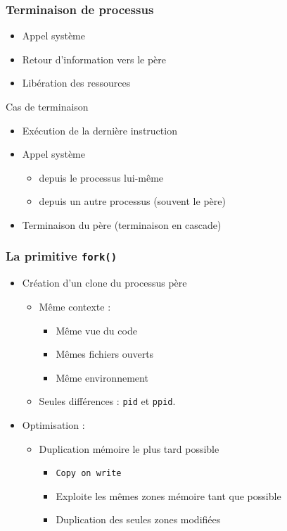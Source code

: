 \begin{frame}
\frametitle{Terminaison de processus}
\begin{itemize}
\item Appel système
\item Retour d’information vers le père
\item Libération des ressources
\end{itemize}
\begin{block}{Cas de terminaison}
\begin{itemize}
\item Exécution de la dernière instruction
\item Appel système 
\begin{itemize}
\item depuis le processus lui-même
\item depuis un autre processus (souvent le père)
\end{itemize}
\item Terminaison du père (terminaison en cascade)
\end{itemize}
\end{block}
\end{frame}


\begin{frame}
\frametitle{La primitive \texttt{fork()}}
\begin{itemize}
\item <1> Création d’un clone du processus père
\begin{itemize}
\item Même contexte :
\begin{itemize}
\item Même vue du code
\item Mêmes fichiers ouverts
\item Même environnement
\end{itemize}
\item Seules différences : \texttt{pid} et \texttt{ppid}.
\end{itemize}
\item <2> Optimisation :
\begin{itemize}
\item Duplication mémoire le plus tard possible
\begin{itemize}
\item \texttt{Copy on write}
\item Exploite les mêmes zones mémoire tant que possible
\item Duplication des seules zones modifiées
\end{itemize}
\end{itemize}
\end{itemize}
\end{frame}

